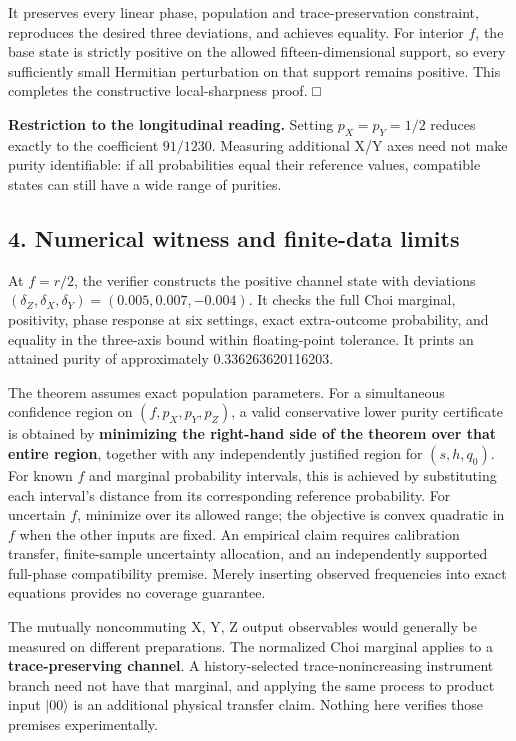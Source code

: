 \documentclass[
  10pt,
  a4paper,
]{article}
\begin{document}
It preserves every linear phase, population and trace-preservation constraint, reproduces the desired three deviations, and achieves equality. For interior \(f\), the base state is strictly positive on the allowed fifteen-dimensional support, so every sufficiently small Hermitian perturbation on that support remains positive. This completes the constructive local-sharpness proof. □

\textbf{Restriction to the longitudinal reading.} Setting \(p_X=p_Y=1/2\) reduces exactly to the coefficient \(91/1230\). Measuring additional X/Y axes need not make purity identifiable: if all probabilities equal their reference values, compatible states can still have a wide range of purities.

\subsection{4. Numerical witness and finite-data limits}\label{numerical-witness-and-finite-data-limits}

At \(f=r/2\), the verifier constructs the positive channel state with deviations \((\delta_Z,\delta_X,\delta_Y)=(0.005,0.007,-0.004)\). It checks the full Choi marginal, positivity, phase response at six settings, exact extra-outcome probability, and equality in the three-axis bound within floating-point tolerance. It prints an attained purity of approximately 0.336263620116203.

The theorem assumes exact population parameters. For a simultaneous confidence region on \((f,p_X,p_Y,p_Z)\), a valid conservative lower purity certificate is obtained by \textbf{minimizing the right-hand side of the theorem over that entire region}, together with any independently justified region for \((s,h,q_0)\). For known \(f\) and marginal probability intervals, this is achieved by substituting each interval's distance from its corresponding reference probability. For uncertain \(f\), minimize over its allowed range; the objective is convex quadratic in \(f\) when the other inputs are fixed. An empirical claim requires calibration transfer, finite-sample uncertainty allocation, and an independently supported full-phase compatibility premise. Merely inserting observed frequencies into exact equations provides no coverage guarantee.

The mutually noncommuting X, Y, Z output observables would generally be measured on different preparations. The normalized Choi marginal applies to a \textbf{trace-preserving channel}. A history-selected trace-nonincreasing instrument branch need not have that marginal, and applying the same process to product input \(|00\rangle\) is an additional physical transfer claim. Nothing here verifies those premises experimentally.
\end{document}
